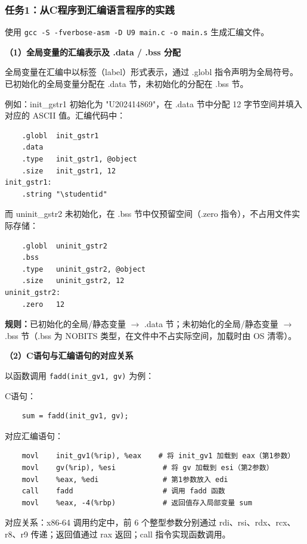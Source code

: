 \documentclass[12pt,a4paper]{ctexart}
\newcommand{\studentid}{U202414869}
\begin{document}
\subsubsection*{任务1：从C程序到汇编语言程序的实践}

使用 \texttt{gcc -S -fverbose-asm -D U9 main.c -o main.s} 生成汇编文件。

\textbf{（1）全局变量的汇编表示及 .data / .bss 分配}

全局变量在汇编中以标签（label）形式表示，通过 .globl 指令声明为全局符号。已初始化的全局变量分配在 .data 节，未初始化的分配在 .bss 节。

例如：init\_gstr1 初始化为 "\studentid"，在 .data 节中分配 12 字节空间并填入对应的 ASCII 值。汇编代码中：

\begin{lstlisting}
    .globl  init_gstr1
    .data
    .type   init_gstr1, @object
    .size   init_gstr1, 12
init_gstr1:
    .string "\studentid"
\end{lstlisting}

而 uninit\_gstr2 未初始化，在 .bss 节中仅预留空间（.zero 指令），不占用文件实际存储：

\begin{lstlisting}
    .globl  uninit_gstr2
    .bss
    .type   uninit_gstr2, @object
    .size   uninit_gstr2, 12
uninit_gstr2:
    .zero   12
\end{lstlisting}

\textbf{规则：}已初始化的全局/静态变量 $\to$ .data 节；未初始化的全局/静态变量 $\to$ .bss 节（.bss 为 NOBITS 类型，在文件中不占实际空间，加载时由 OS 清零）。

\textbf{（2）C语句与汇编语句的对应关系}

以函数调用 \texttt{fadd(init\_gv1, gv)} 为例：

C语句：
\begin{lstlisting}
    sum = fadd(init_gv1, gv);
\end{lstlisting}

对应汇编语句：
\begin{lstlisting}
    movl    init_gv1(%rip), %eax    # 将 init_gv1 加载到 eax（第1参数）
    movl    gv(%rip), %esi           # 将 gv 加载到 esi（第2参数）
    movl    %eax, %edi               # 第1参数放入 edi
    call    fadd                     # 调用 fadd 函数
    movl    %eax, -4(%rbp)           # 返回值存入局部变量 sum
\end{lstlisting}

对应关系：x86-64 调用约定中，前 6 个整型参数分别通过 rdi、rsi、rdx、rcx、r8、r9 传递；返回值通过 rax 返回；call 指令实现函数调用。
\end{document}
